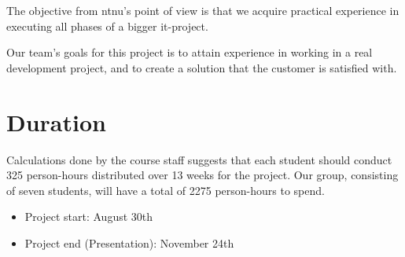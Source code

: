 The objective from \Gls{ntnu}'s point of view is that we acquire practical experience in executing all phases of a bigger \Gls{it}-project.

Our team's goals for this project is to attain experience in working in a real development project, and to create a solution that the customer
is satisfied with.

\section{Duration}
Calculations done by the course staff suggests that each student should conduct 325 person-hours distributed over 13 weeks for the project. Our group, consisting of seven students, will have a total of 2275 person-hours to spend.\\
\begin {itemize}
	\item Project start: August 30th
	\item Project end (Presentation): November 24th
\end{itemize}

